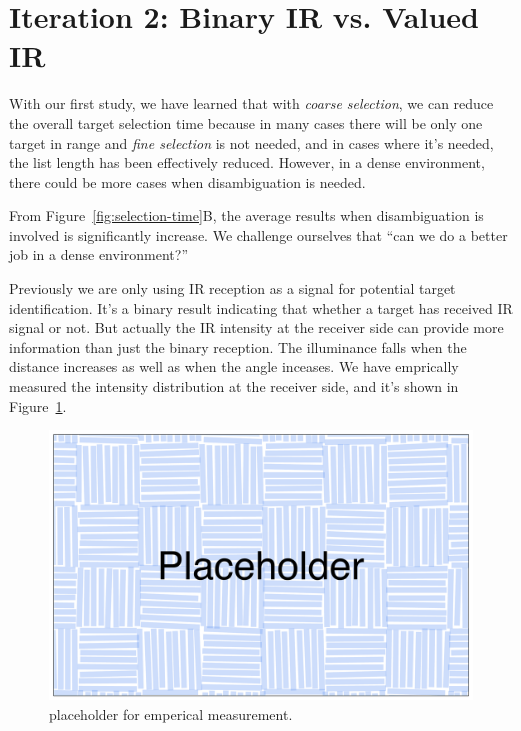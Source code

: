 \section{Iteration 2: Binary IR vs. Valued IR}

With our first study, we have learned that with {\em coarse selection}, we can reduce the overall target selection time because in many cases there will be only one target in range and {\em fine selection} is not needed, and in cases where it's needed, the list length has been effectively reduced. However, in a dense environment, there could be more cases when disambiguation is needed. 

From Figure~\ref{fig:selection-time}B, the average results when disambiguation is involved is significantly increase. We challenge ourselves that ``can we do a better job in a dense environment?''

Previously we are only using IR reception as a signal for potential target identification. It's a binary result indicating that whether a target has received IR signal or not. But actually the IR intensity at the receiver side can provide more information than just the binary reception. The illuminance falls when the distance increases as well as when the angle inceases.
We have emprically measured the intensity distribution at the receiver side, and it's shown in Figure~\ref{fig:measurement}.

\begin{figure}[t]
\centering
\includegraphics[width=0.9\columnwidth]{figures/placeholder.pdf}
\caption{placeholder for emperical measurement.}
\label{fig:measurement}
\end{figure}


